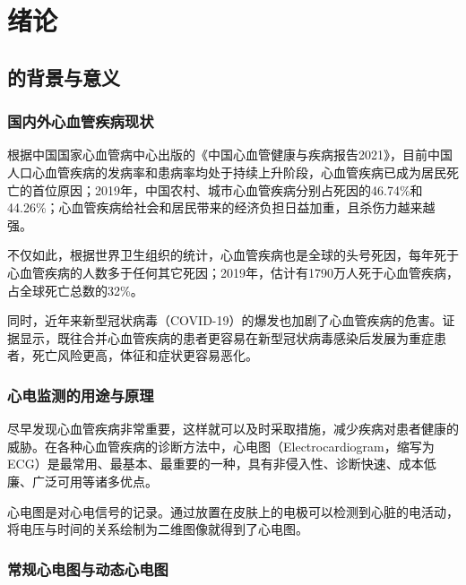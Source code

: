 

\chapter{绪论}\label{ch:intro}


\section{\app 的背景与意义}\label{sec:background}

\subsection{国内外心血管疾病现状}\label{subsec:disease}

根据中国国家心血管病中心出版的《中国心血管健康与疾病报告2021》，目前中国人口心血管疾病的发病率和患病率均处于持续上升阶段，心血管疾病已成为居民死亡的首位原因；2019年，中国农村、城市心血管疾病分别占死因的46.74\%和44.26\%；心血管疾病给社会和居民带来的经济负担日益加重，且杀伤力越来越强\cite{Zhongguoxinxieguanjiankangyujibingbaogao20212022}。

不仅如此，根据世界卫生组织的统计，心血管疾病也是全球的头号死因，每年死于心血管疾病的人数多于任何其它死因；2019年，估计有1790万人死于心血管疾病，占全球死亡总数的32\%\cite{CardiovascularDiseasesCVDs}。

同时，近年来新型冠状病毒（COVID-19）的爆发也加剧了心血管疾病的危害。证据显示，既往合并心血管疾病的患者更容易在新型冠状病毒感染后发展为重症患者，死亡风险更高，体征和症状更容易恶化\cite{zhangXinxingguanzhuangbingdufeiyanyuxinxieguanjibing2020}。

\subsection{心电监测的用途与原理}\label{subsec:monitoring}

尽早发现心血管疾病非常重要，这样就可以及时采取措施，减少疾病对患者健康的威胁\cite{CardiovascularDiseasesCVDs}。在各种心血管疾病的诊断方法中，心电图（Electrocardiogram，缩写为ECG）是最常用、最基本、最重要的一种，具有非侵入性、诊断快速、成本低廉、广泛可用等诸多优点\cite{Xinxieguanjibingzhenduanliuchengyuzhiliaocelue2007}。

心电图是对心电信号的记录。通过放置在皮肤上的电极可以检测到心脏的电活动，将电压与时间的关系绘制为二维图像就得到了心电图。

\subsection{常规心电图与动态心电图}\label{subsec:standard-holter}

